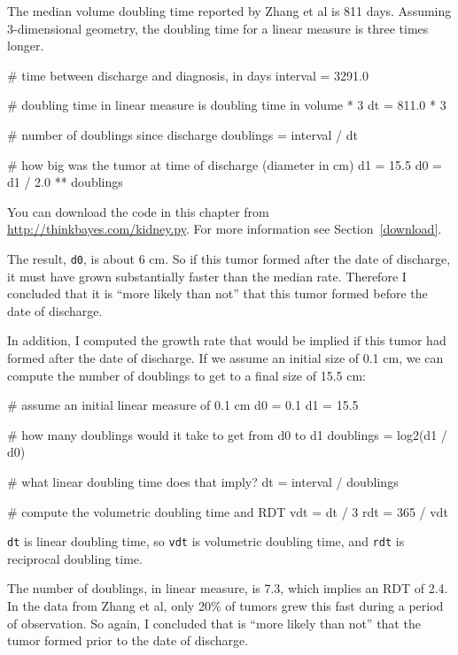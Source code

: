 \documentclass[12pt]{book}
\theoremstyle{exercise}
\newcommand{\py}[1]{{\tt #1}}%
\begin{document}
The median volume doubling time reported by Zhang et al is 811 days.
Assuming 3-dimensional geometry, the doubling time for a linear
measure is three times longer.

\begin{code}
    # time between discharge and diagnosis, in days
    interval = 3291.0

    # doubling time in linear measure is doubling time in volume * 3
    dt = 811.0 * 3

    # number of doublings since discharge
    doublings = interval / dt

    # how big was the tumor at time of discharge (diameter in cm)
    d1 = 15.5
    d0 = d1 / 2.0 ** doublings
\end{code}

You can download the code in this chapter from
\url{http://thinkbayes.com/kidney.py}.  For more information
see Section~\ref{download}.

The result, \py{d0}, is about 6 cm.  So if this tumor formed after
the date of discharge, it must have grown substantially faster than
the median rate.  Therefore I concluded that it is ``more likely than
not'' that this tumor formed before the date of discharge.

In addition, I computed the growth rate that would be implied
if this tumor had formed after the date of discharge.  If we
assume an initial size of 0.1 cm, we can compute the number of
doublings to get to a final size of 15.5 cm:

\begin{code}
    # assume an initial linear measure of 0.1 cm
    d0 = 0.1
    d1 = 15.5

    # how many doublings would it take to get from d0 to d1
    doublings = log2(d1 / d0)

    # what linear doubling time does that imply?
    dt = interval / doublings

    # compute the volumetric doubling time and RDT
    vdt = dt / 3
    rdt = 365 / vdt
\end{code}

\py{dt} is linear doubling time, so \py{vdt} is volumetric
doubling time, and \py{rdt} is reciprocal doubling
time.

The number of doublings, in linear measure, is 7.3, which implies
an RDT of 2.4.  In the data from Zhang et al, only 20\% of tumors
grew this fast during a period of observation.  So again,
I concluded that is ``more likely than not'' that the tumor
formed prior to the date of discharge.
\end{document}
